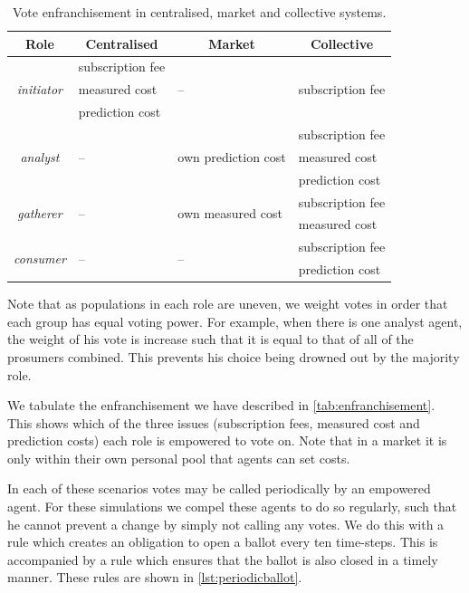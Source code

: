 \begin{table}
\centering
\caption{Vote enfranchisement in centralised, market and collective systems.}\label{tab:enfranchisement}
\begin{tabularx}{\textwidth}{c|lll}
Role & \multicolumn{1}{c}{Centralised} & \multicolumn{1}{c}{Market} & \multicolumn{1}{c}{Collective} \\
\hline
\multirow{3}{*}{\emph{initiator}} & subscription fee & \multirow{3}{*}{--} & \multirow{3}{*}{subscription fee} \\
& measured cost & & \\
& prediction cost & & \\
\hline
\multirow{3}{*}{\emph{analyst}} & \multirow{3}{*}{--} &  \multirow{3}{*}{own prediction cost} & subscription fee \\
& & & measured cost \\
& & & prediction cost \\
\hline
\multirow{2}{*}{\emph{gatherer}} & \multirow{2}{*}{--} & \multirow{2}{*}{own measured cost} & subscription fee \\
& & & measured cost \\
\hline
\multirow{2}{*}{\emph{consumer}} & \multirow{2}{*}{--} & \multirow{2}{*}{--} & subscription fee \\
& & & prediction cost \\
\end{tabularx}
\end{table}

Note that as populations in each role are uneven, we weight votes in order
that each group has equal voting power. For example, when there is one analyst
agent, the weight of his vote is increase such that it is equal to that of all
of the prosumers combined. This prevents his choice being drowned out by the
majority role.

We tabulate the enfranchisement we have described in
\autoref{tab:enfranchisement}. This shows which of the three issues
(subscription fees, measured cost and prediction costs) each role is empowered
to vote on. Note that in a market it is only within their own personal pool
that agents can set costs.

In each of these scenarios votes may be called periodically by an empowered
agent. For these simulations we compel these agents to do so regularly, such
that he cannot prevent a change by simply not calling any votes. We do this
with a rule which creates an obligation to open a ballot every ten time-steps.
This is accompanied by a  rule which ensures that the ballot is also closed in
a timely manner. These rules are shown in \autoref{lst:periodicballot}.

